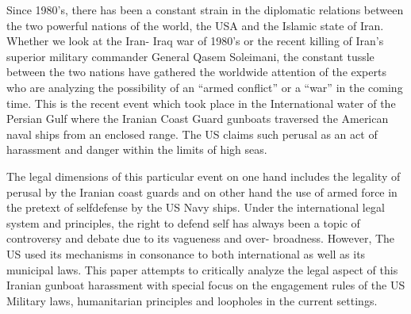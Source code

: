 \setcounter{figure}{0}
\setcounter{table}{0}
\setcounter{footnote}{0}


\label{2020-art7}

\begin{multicols}{2}


\noi
Since 1980’s, there has been a constant strain in the diplomatic relations between the two
powerful nations of the world, the USA and the Islamic state of Iran. Whether we look at
the Iran- Iraq war of 1980’s or the recent killing of Iran’s superior military commander
General Qasem Soleimani, the constant tussle between the two nations have gathered the
worldwide attention of the experts who are analyzing the possibility of an “armed conflict”
or a “war” in the coming time. This is the recent event which took place in the International
water of the Persian Gulf where the Iranian Coast Guard gunboats traversed the American
naval ships from an enclosed range. The US claims such perusal as an act of harassment and
danger within the limits of high seas.

\noi
The legal dimensions of this particular event on one hand includes the legality of perusal by
the Iranian coast guards and on other hand the use of armed force in the pretext of selfdefense by the US Navy ships. Under the international legal system and principles, the right
to defend self has always been a topic of controversy and debate due to its vagueness and
over- broadness. However, The US used its mechanisms in consonance to both international
as well as its municipal laws. This paper attempts to critically analyze the legal aspect of
this Iranian gunboat harassment with special focus on the engagement rules of the US
Military laws, humanitarian principles and loopholes in the current settings.


\end{multicols}
